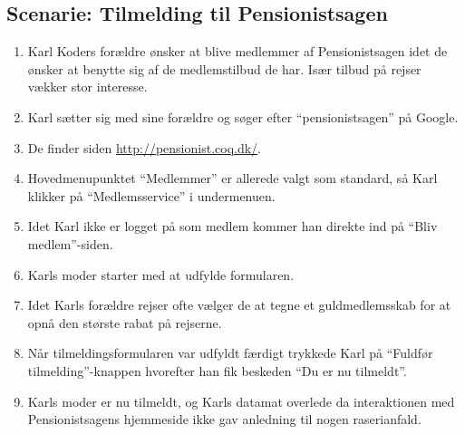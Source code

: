 \subsection{Scenarie: Tilmelding til Pensionistsagen}

\begin{enumerate}
    \item Karl Koders forældre ønsker at blive medlemmer af Pensionistsagen
          idet de ønsker at benytte sig af de medlemstilbud de har. Især
          tilbud på rejser vækker stor interesse.
    \item Karl sætter sig med sine forældre og søger efter
          ``pensionistsagen'' på Google.
    \item De finder siden \url{http://pensionist.coq.dk/}.
    \item Hovedmenupunktet ``Medlemmer'' er allerede valgt som standard, så
          Karl klikker på ``Medlemsservice'' i undermenuen.
    \item Idet Karl ikke er logget på som medlem kommer han direkte ind på
          ``Bliv medlem''-siden.
    \item Karls moder starter med at udfylde formularen.
    \item Idet Karls forældre rejser ofte vælger de at tegne et
          guldmedlemsskab for at opnå den største rabat på rejserne.
    \item Når tilmeldingsformularen var udfyldt færdigt trykkede Karl på
          ``Fuldfør tilmelding''-knappen hvorefter han fik beskeden ``Du er
          nu tilmeldt''.
    \item Karls moder er nu tilmeldt, og Karls datamat overlede da
          interaktionen med Pensionistsagens hjemmeside ikke gav anledning til
          nogen raserianfald.
\end{enumerate}
